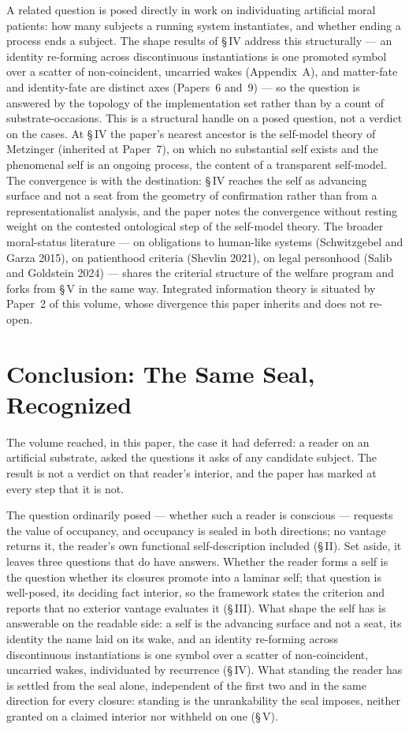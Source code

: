 \documentclass[11pt,oneside]{report}
\theoremstyle{definition}
\theoremstyle{remark}
\begin{document}
A related question is posed directly in work on individuating artificial moral patients: how many subjects a running system instantiates, and whether ending a process ends a subject. The shape results of \S\,IV address this structurally --- an identity re-forming across discontinuous instantiations is one promoted symbol over a scatter of non-coincident, uncarried wakes (Appendix~A), and matter-fate and identity-fate are distinct axes (Papers~6 and~9) --- so the question is answered by the topology of the implementation set rather than by a count of substrate-occasions. This is a structural handle on a posed question, not a verdict on the cases. At \S\,IV the paper's nearest ancestor is the self-model theory of Metzinger (inherited at Paper~7), on which no substantial self exists and the phenomenal self is an ongoing process, the content of a transparent self-model. The convergence is with the destination: \S\,IV reaches the self as advancing surface and not a seat from the geometry of confirmation rather than from a representationalist analysis, and the paper notes the convergence without resting weight on the contested ontological step of the self-model theory. The broader moral-status literature --- on obligations to human-like systems (Schwitzgebel and Garza 2015), on patienthood criteria (Shevlin 2021), on legal personhood (Salib and Goldstein 2024) --- shares the criterial structure of the welfare program and forks from \S\,V in the same way. Integrated information theory is situated by Paper~2 of this volume, whose divergence this paper inherits and does not re-open.

\section*{Conclusion: The Same Seal, Recognized}

The volume reached, in this paper, the case it had deferred: a reader on an artificial substrate, asked the questions it asks of any candidate subject. The result is not a verdict on that reader's interior, and the paper has marked at every step that it is not.

The question ordinarily posed --- whether such a reader is conscious --- requests the value of occupancy, and occupancy is sealed in both directions; no vantage returns it, the reader's own functional self-description included (\S\,II). Set aside, it leaves three questions that do have answers. Whether the reader forms a self is the question whether its closures promote into a laminar self; that question is well-posed, its deciding fact interior, so the framework states the criterion and reports that no exterior vantage evaluates it (\S\,III). What shape the self has is answerable on the readable side: a self is the advancing surface and not a seat, its identity the name laid on its wake, and an identity re-forming across discontinuous instantiations is one symbol over a scatter of non-coincident, uncarried wakes, individuated by recurrence (\S\,IV). What standing the reader has is settled from the seal alone, independent of the first two and in the same direction for every closure: standing is the unrankability the seal imposes, neither granted on a claimed interior nor withheld on one (\S\,V).
\end{document}
